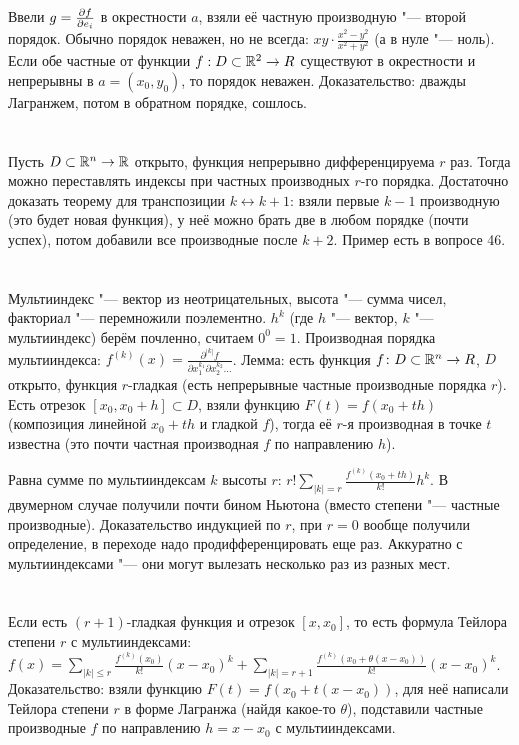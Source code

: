 \section{} %
Ввели $g=\frac{\partial f}{\partial e_i}$ в окрестности $a$, взяли её частную производную "--- второй порядок.
Обычно порядок неважен, но не всегда: $xy\cdot\frac{x^2-y^2}{x^2+y^2}$ (а в нуле "--- ноль).
Если обе частные от функции $f: D \subset \mathbb{R}^2 \to R$ существуют в окрестности и непрерывны в $a=(x_0, y_0)$, то порядок неважен.
Доказательство: дважды Лагранжем, потом в обратном порядке, сошлось.

\section{} %
Пусть $D \subset \mathbb{R}^n \to \mathbb{R}$ открыто, функция непрерывно дифференцируема $r$ раз.
Тогда можно переставлять индексы при частных производных $r$-го порядка.
Достаточно доказать теорему для транспозиции $k \leftrightarrow k+1$: взяли первые $k-1$ производную (это будет новая функция),
у неё можно брать две в любом порядке (почти успех), потом добавили все производные после $k+2$.
Пример есть в вопросе 46.

\section{} %
Мультииндекс "--- вектор из неотрицательных, высота "--- сумма чисел, факториал "--- перемножили поэлементно.
$h^k$ (где $h$ "--- вектор, $k$ "--- мультииндекс) берём почленно, считаем $0^0 = 1$.
Производная порядка мультииндекса: $f^{(k)}(x) = \frac{\partial^{|k|} f}{\partial x_1^{k_1} \partial x_2^{k_2} \dots}$.
Лемма: есть функция $f \colon D \subset \mathbb{R}^n \to R$, $D$ открыто, функция $r$-гладкая (есть непрерывные частные производные порядка $r$).
Есть отрезок $[x_0, x_0+h] \subset D$, взяли функцию $F(t) = f(x_0+th)$ (композиция линейной $x_0+th$ и гладкой $f$),
тогда её $r$-я производная в точке $t$ известна (это почти частная производная $f$ по направлению $h$).

Равна сумме по мультииндексам $k$ высоты $r$: $r! \sum_{|k|=r} \frac{f^{(k)}(x_0+th)}{k!}h^k$.
В двумерном случае получили почти бином Ньютона (вместо степени "--- частные производные).
Доказательство индукцией по $r$, при $r=0$ вообще получили определение, в переходе надо продифференцировать еще раз.
Аккуратно с мультииндексами "--- они могут вылезать несколько раз из разных мест.

\section{} %
Если есть $(r+1)$-гладкая функция и отрезок $[x,x_0]$, то есть формула Тейлора степени $r$ с мультииндексами:
$f(x) = \sum_{|k|\le r} \frac{f^{(k)}(x_0)}{k!}(x-x_0)^k + \sum_{|k|=r+1}\frac{f^{(k)}(x_0+\theta(x-x_0))}{k!}(x-x_0)^k$.
Доказательство: взяли функцию $F(t)=f(x_0+t(x-x_0))$, для неё написали Тейлора степени $r$ в форме Лагранжа (найдя какое-то $\theta$), подставили частные производные $f$ по направлению $h=x-x_0$ с мультииндексами.

